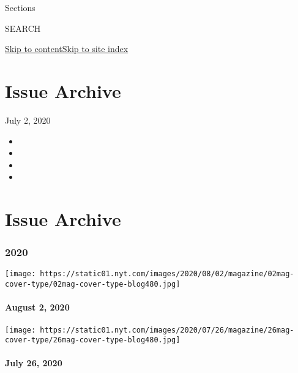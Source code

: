 Sections

SEARCH

\protect\hyperlink{site-content}{Skip to
content}\protect\hyperlink{site-index}{Skip to site index}

\hypertarget{issue-archive}{%
\section{Issue Archive}\label{issue-archive}}

July 2, 2020

\begin{itemize}
\item
\item
\item
\item
\end{itemize}

\hypertarget{issue-archive-1}{%
\section{Issue Archive}\label{issue-archive-1}}

\hypertarget{2020}{%
\subsubsection{2020}\label{2020}}

\href{https://www.nytimes.com/issue/magazine/2020/07/31/the-8220-issue}{}

\texttt{[image: https://static01.nyt.com/images/2020/08/02/magazine/02mag-cover-type/02mag-cover-type-blog480.jpg]}

\hypertarget{august-2-2020}{%
\paragraph{August 2, 2020}\label{august-2-2020}}

\href{https://www.nytimes.com/issue/magazine/2020/07/24/the-72620-issue}{}

\texttt{[image: https://static01.nyt.com/images/2020/07/26/magazine/26mag-cover-type/26mag-cover-type-blog480.jpg]}

\hypertarget{july-26-2020}{%
\paragraph{July 26, 2020}\label{july-26-2020}}

\href{https://www.nytimes.com/issue/magazine/2020/07/17/the-71920-issue}{}

